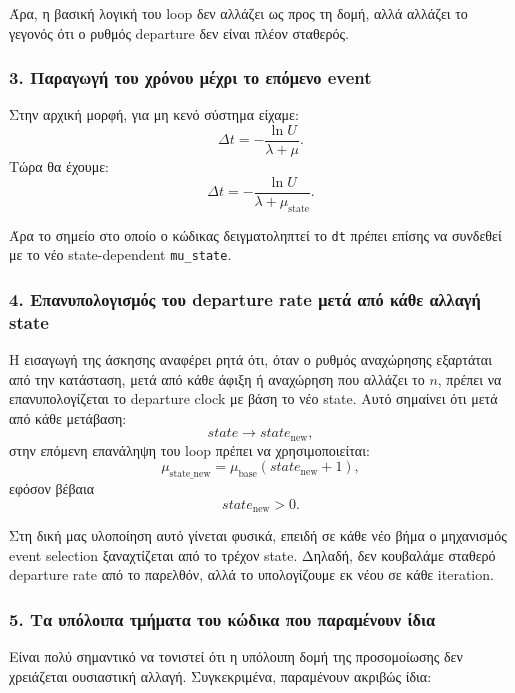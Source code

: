 \documentclass{article}
\begin{document}
Άρα, η βασική λογική του loop δεν αλλάζει ως προς τη δομή, αλλά αλλάζει το γεγονός ότι ο ρυθμός departure δεν είναι πλέον σταθερός.

\subsubsection*{3. Παραγωγή του χρόνου μέχρι το επόμενο event}

Στην αρχική μορφή, για μη κενό σύστημα είχαμε:
\[
\Delta t = -\frac{\ln U}{\lambda+\mu}.
\]
Τώρα θα έχουμε:
\[
\Delta t = -\frac{\ln U}{\lambda+\mu_{\text{state}}}.
\]

Άρα το σημείο στο οποίο ο κώδικας δειγματοληπτεί το \texttt{dt} πρέπει επίσης να συνδεθεί με το νέο state-dependent \texttt{mu\_state}.

\subsubsection*{4. Επανυπολογισμός του departure rate μετά από κάθε αλλαγή state}

Η εισαγωγή της άσκησης αναφέρει ρητά ότι, όταν ο ρυθμός αναχώρησης εξαρτάται από την κατάσταση, μετά από κάθε άφιξη ή αναχώρηση που αλλάζει το $n$, πρέπει να επανυπολογίζεται το departure clock με βάση το νέο state. Αυτό σημαίνει ότι μετά από κάθε μετάβαση:
\[
state \to state_{\text{new}},
\]
στην επόμενη επανάληψη του loop πρέπει να χρησιμοποιείται:
\[
\mu_{\text{state\_new}} = \mu_{\text{base}}(state_{\text{new}}+1),
\]
εφόσον βέβαια
\[
state_{\text{new}} > 0.
\]

Στη δική μας υλοποίηση αυτό γίνεται φυσικά, επειδή σε κάθε νέο βήμα ο μηχανισμός event selection ξαναχτίζεται από το τρέχον state. Δηλαδή, δεν κουβαλάμε σταθερό departure rate από το παρελθόν, αλλά το υπολογίζουμε εκ νέου σε κάθε iteration.

\subsubsection*{5. Τα υπόλοιπα τμήματα του κώδικα που παραμένουν ίδια}

Είναι πολύ σημαντικό να τονιστεί ότι η υπόλοιπη δομή της προσομοίωσης δεν χρειάζεται ουσιαστική αλλαγή. Συγκεκριμένα, παραμένουν ακριβώς ίδια:
\end{document}
